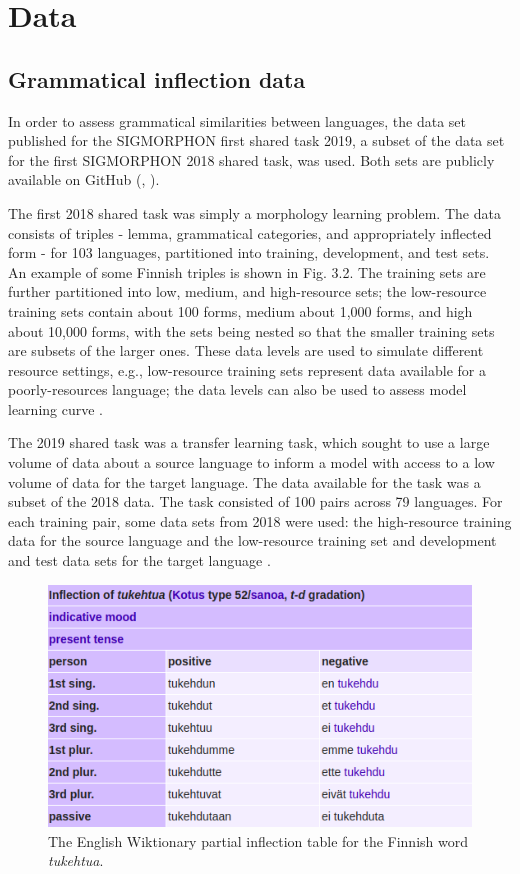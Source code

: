 \chapter{Data}

\section{Grammatical inflection data}

In order to assess grammatical similarities between languages, the data set published for the SIGMORPHON first shared task 2019, a subset of the data set for the first SIGMORPHON 2018 shared task, was used. Both sets are publicly available on GitHub (\cite{McCarthy2019}, \cite{Cotterell2018b}).

The first 2018 shared task was simply a morphology learning problem. The data consists of triples - lemma, grammatical categories, and appropriately inflected form - for 103 languages, partitioned into training, development, and test sets. An example of some Finnish triples is shown in Fig. 3.2. The training sets are further partitioned into low, medium, and high-resource sets; the low-resource training sets contain about 100 forms, medium about 1,000 forms, and high about 10,000 forms, with the sets being nested so that the smaller training sets are subsets of the larger ones. These data levels are used to simulate different resource settings, e.g., low-resource training sets represent data available for a poorly-resources language; the data levels can also be used to assess model learning curve \parencite{Cotterell2018b}.

The 2019 shared task was a transfer learning task, which sought to use a large volume of data about a source language to inform a model with access to a low volume of data for the target language. The data available for the task was a subset of the 2018 data. The task consisted of 100 pairs across 79 languages. For each training pair, some data sets from 2018 were used: the high-resource training data for the source language and the low-resource training set and development and test data sets for the target language \parencite{McCarthy2019}.

\begin{figure}[ht]
\includegraphics[width=12cm]{images/tukehtua.png}
\centering
\caption{The English Wiktionary partial inflection table for the Finnish word \textit{tukehtua}.}
\end{figure}


